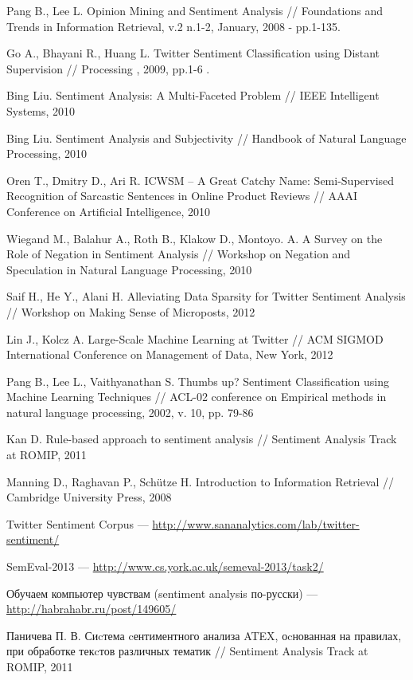 
Pang B., Lee L. Opinion Mining and Sentiment Analysis // Foundations and 
Trends in Information Retrieval, v.2 n.1-2, January, 2008 - pp.1-135.

Go A., Bhayani R., Huang L. Twitter Sentiment Classification using Distant Supervision // Processing , 2009, pp.1-6 .

Bing Liu. Sentiment Analysis: A Multi-Faceted Problem // IEEE Intelligent Systems, 2010

Bing Liu. Sentiment Analysis and Subjectivity // Handbook of Natural Language Processing, 2010

Oren T., Dmitry D., Ari R. ICWSM – A Great Catchy Name: Semi-Supervised Recognition of Sarcastic Sentences in Online Product Reviews // AAAI Conference on Artificial Intelligence, 2010 

Wiegand M., Balahur A., Roth B., Klakow D., Montoyo. A. A Survey on the Role of Negation in Sentiment Analysis // Workshop on Negation and Speculation in Natural Language Processing, 2010

Saif H., He Y., Alani H. Alleviating Data Sparsity for Twitter Sentiment Analysis // Workshop on Making Sense of Microposts, 2012

Lin J., Kolcz A. Large-Scale Machine Learning at Twitter // ACM SIGMOD International Conference on Management of Data, New York, 2012

Pang B., Lee L., Vaithyanathan S. Thumbs up? Sentiment Classification using Machine Learning Techniques // ACL-02 conference on Empirical methods in natural language processing, 2002, v. 10, pp. 79-86

Kan D. Rule-based approach to sentiment analysis // Sentiment Analysis Track at 
ROMIP, 2011

Manning D., Raghavan P., Schütze H. Introduction to Information Retrieval // Cambridge University Press, 2008

Twitter Sentiment Corpus --- \url{http://www.sananalytics.com/lab/twitter-sentiment/}

SemEval-2013 --- \url{http://www.cs.york.ac.uk/semeval-2013/task2/}

Обучаем компьютер чувствам (sentiment analysis по-русски) --- \url{http://habrahabr.ru/post/149605/}

Паничева П. В. Сиcтема cентиментного анализа ATEX, оcнованная
на правилах, при обработке текcтов различных тематик // Sentiment Analysis Track at ROMIP, 2011

